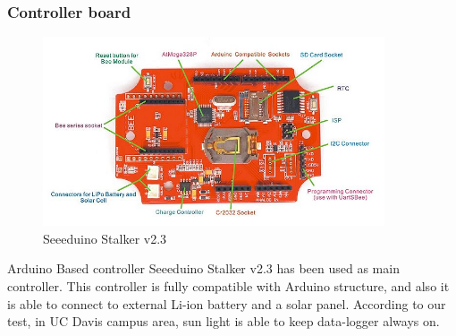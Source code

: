     \subsubsection{Controller board}
    \begin{figure}[ht]
    \centering
    \includegraphics[width=0.9\textwidth]{Stalker.jpg}
    \caption{\label{fig:Seeeduino Stalker}Seeeduino Stalker v2.3}
    \end{figure}
  Arduino Based controller Seeeduino Stalker v2.3 has been used as main controller. This controller is fully compatible with Arduino structure, and also it is able to connect to external Li-ion battery and a solar panel. According to our test, in UC Davis campus area, sun light is able to keep data-logger always on. 

